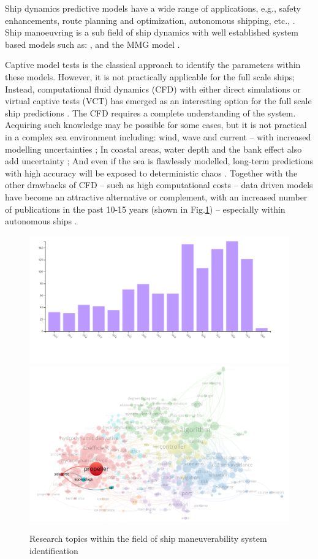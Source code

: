 Ship dynamics predictive models have a wide range of applications, e.g., safety enhancements, route planning and optimization, autonomous shipping, etc., \citep{aslam_internet_2020}.
Ship manoeuvring is a sub field of ship dynamics with well established system based models such as: \citet{abkowitz_ship_1964,nomoto_steering_1957,norrbin_theory_1971}, and the MMG model \citep{yasukawa_introduction_2015}.

Captive model tests is the classical approach to identify the parameters within these models. However, it is not practically applicable for the full scale ships; Instead, computational fluid dynamics (CFD) with either direct simulations or virtual captive tests (VCT) has emerged as an interesting option for the full scale ship predictions \citep{liu_predictions_2018,li_ship_2022}.
The CFD requires a complete understanding of the system. Acquiring such knowledge may be possible for some cases, but it is not practical in a complex sea environment including: wind, wave and current -- with increased modelling uncertainties \citep{miller_ship_2021}; In coastal areas, water depth and the bank effect also add uncertainty  \citep{nielsen_machine_2022};
And even if the sea is flawlessly modelled, long-term predictions with high accuracy will be exposed to deterministic chaos \citep{lorenz_deterministic_1963}.
Together with the other drawbacks of CFD -- such as high computational costs -- data driven models have become an attractive alternative or complement, with an increased number of publications in the past 10-15 years (shown in Fig.\ref{fig:pub_overview}) -- especially within autonomous ships \citep{ahmed_survey_2023}.
%
\begin{figure}[h]
  \includegraphics[width=.5\textwidth]{figures/trendinyear.jpg}
  \includegraphics[width=.5\textwidth]{figures/wind_drift_research.png}
  \caption{Research topics within the field of ship maneuverability system identification}
  \label{fig:pub_overview}
\end{figure}
%

